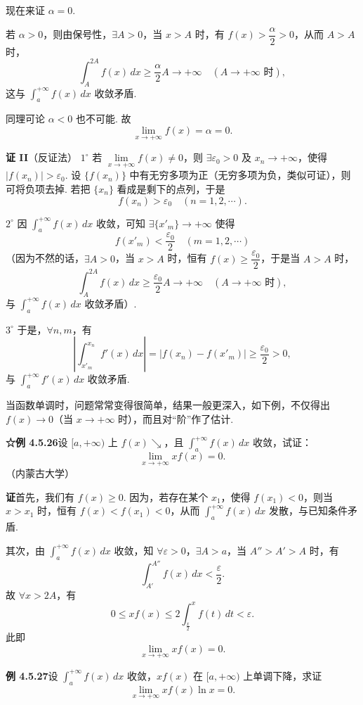 \documentclass[UTF8,12pt,a4paper,fontset=fandol]{ctexart}
\begin{document}
现在来证 $\alpha=0$.

若 $\alpha>0$，则由保号性，$\exists A>0$，当 $x>A$ 时，有 $f(x)>\dfrac\alpha2>0$，从而 $A>A$ 时，
\[
\int_A^{2A}f(x)\,dx\ge\frac\alpha2A\longrightarrow+\infty\quad(A\to+\infty\text{ 时}),
\]
这与 $\displaystyle\int_a^{+\infty}f(x)\,dx$ 收敛矛盾.

同理可论 $\alpha<0$ 也不可能. 故
\[
\lim_{x\to+\infty}f(x)=\alpha=0.
\]

\noindent\textbf{证 II}\quad （反证法）
$1^\circ$ 若 $\lim\limits_{x\to+\infty}f(x)\ne0$，则 $\exists\varepsilon_0>0$ 及 $x_n\to+\infty$，使得 $|f(x_n)|>\varepsilon_0$. 设 $\{f(x_n)\}$ 中有无穷多项为正（无穷多项为负，类似可证），则可将负项去掉. 若把 $\{x_n\}$ 看成是剩下的点列，于是
\[
f(x_n)>\varepsilon_0\quad(n=1,2,\cdots).
\]

$2^\circ$ 因 $\displaystyle\int_a^{+\infty}f(x)\,dx$ 收敛，可知 $\exists\{x'_m\}\to+\infty$ 使得
\[
f(x'_m)<\frac{\varepsilon_0}2\quad(m=1,2,\cdots)
\]
（因为不然的话，$\exists A>0$，当 $x>A$ 时，恒有 $f(x)\ge\dfrac{\varepsilon_0}2$，于是当 $A>A$ 时，
\[
\int_A^{2A}f(x)\,dx\ge\frac{\varepsilon_0}2A\longrightarrow+\infty\quad(A\to+\infty\text{ 时}),
\]
与 $\displaystyle\int_a^{+\infty}f(x)\,dx$ 收敛矛盾）.

$3^\circ$ 于是，$\forall n,m$，有
\[
\left|\int_{x'_m}^{x_n}f'(x)\,dx\right|
=|f(x_n)-f(x'_m)|\ge\frac{\varepsilon_0}2>0,
\]
与 $\displaystyle\int_a^{+\infty}f'(x)\,dx$ 收敛矛盾.

当函数单调时，问题常常变得很简单，结果一般更深入，如下例，不仅得出 $f(x)\to0$（当 $x\to+\infty$ 时），而且对“阶”作了估计.

\noindent\textbf{☆例 4.5.26}\quad 设 $[a,+\infty)$ 上 $f(x)\searrow$，且 $\displaystyle\int_a^{+\infty}f(x)\,dx$ 收敛，试证：
\[
\lim_{x\to+\infty}xf(x)=0.
\]
（内蒙古大学）

\noindent\textbf{证}\quad 首先，我们有 $f(x)\ge0$. 因为，若存在某个 $x_1$，使得 $f(x_1)<0$，则当 $x>x_1$ 时，恒有 $f(x)<f(x_1)<0$，从而 $\displaystyle\int_a^{+\infty}f(x)\,dx$ 发散，与已知条件矛盾.

其次，由 $\displaystyle\int_a^{+\infty}f(x)\,dx$ 收敛，知 $\forall\varepsilon>0$，$\exists A>a$，当 $A''>A'>A$ 时，有
\[
\int_{A'}^{A''}f(x)\,dx<\frac\varepsilon2.
\]
故 $\forall x>2A$，有
\[
0\le xf(x)\le2\int_{\frac x2}^xf(t)\,dt<\varepsilon.
\]
此即
\[
\lim_{x\to+\infty}xf(x)=0.
\]

\noindent\textbf{例 4.5.27}\quad 设 $\displaystyle\int_a^{+\infty}f(x)\,dx$ 收敛，$xf(x)$ 在 $[a,+\infty)$ 上单调下降，求证
\[
\lim_{x\to+\infty}xf(x)\ln x=0.
\]
\end{document}
